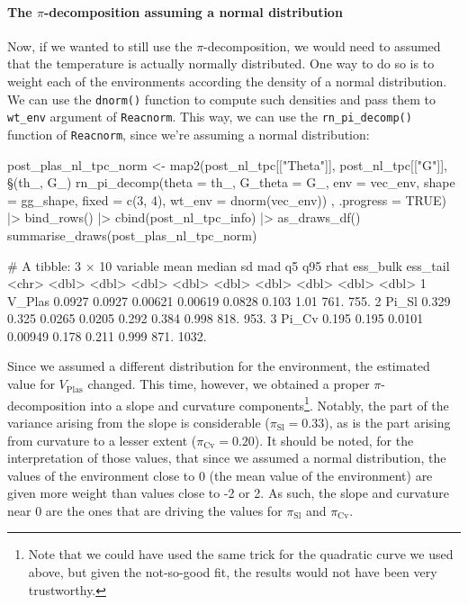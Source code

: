 \documentclass[a4paper,12pt,twoside]{article}
\begin{document}
\paragraph{The $\pi$-decomposition assuming a normal distribution}
Now, if we wanted to still use the $\pi$-decomposition, we would need to assumed that the temperature is actually normally distributed.
One way to do so is to weight each of the environments according the density of a normal distribution.
We can use the \texttt{dnorm()} function to compute such densities and pass them to \texttt{wt\_env} argument of \texttt{Reacnorm}.
This way, we can use the \texttt{rn\_pi\_decomp()} function of \texttt{Reacnorm}, since we're assuming a normal distribution:
\begin{Rinput}
post_plas_nl_tpc_norm <-
    map2(post_nl_tpc[["Theta"]], post_nl_tpc[["G"]],
         \§§(th_, G_) { rn_pi_decomp(theta    = th_,
                                   G_theta  = G_,
                                   env      = vec_env,
                                   shape    = gg_shape,
                                   fixed    = c(3, 4),
                                   wt_env   = dnorm(vec_env)) },
         .progress = TRUE) |>
    bind_rows() |>
    cbind(post_nl_tpc_info) |>
    as_draws_df()
summarise_draws(post_plas_nl_tpc_norm)
\end{Rinput}
\begin{Routput}
# A tibble: 3 × 10
  variable   mean median      sd     mad     q5   q95  rhat ess_bulk ess_tail
  <chr>     <dbl>  <dbl>   <dbl>   <dbl>  <dbl> <dbl> <dbl>    <dbl>    <dbl>
1 V_Plas   0.0927 0.0927 0.00621 0.00619 0.0828 0.103 1.01      761.     755.
2 Pi_Sl    0.329  0.325  0.0265  0.0205  0.292  0.384 0.998     818.     953.
3 Pi_Cv    0.195  0.195  0.0101  0.00949 0.178  0.211 0.999     871.    1032.
\end{Routput}
Since we assumed a different distribution for the environment, the estimated value for $V_{\text{Plas}}$ changed.
This time, however, we obtained a proper $\pi$-decomposition into a slope and curvature components\footnote{Note that we could have used the same trick for the quadratic curve we used above, but given the not-so-good fit, the results would not have been very trustworthy.}.
Notably, the part of the variance arising from the slope is considerable ($\pi_{\text{Sl}} = 0.33$), as is the part arising from curvature to a lesser extent ($\pi_{\text{Cv}} = 0.20$).
It should be noted, for the interpretation of those values, that since we assumed a normal distribution, the values of the environment close to 0 (the mean value of the environment) are given more weight than values close to -2 or 2.
As such, the slope and curvature near 0 are the ones that are driving the values for $\pi_{\text{Sl}}$ and $\pi_{\text{Cv}}$.
\end{document}
